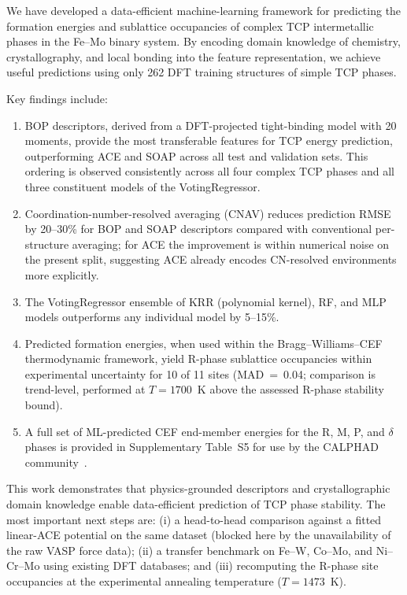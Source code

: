 
We have developed a data-efficient machine-learning framework for predicting the formation energies and sublattice occupancies of complex TCP intermetallic phases in the Fe--Mo binary system. By encoding domain knowledge of chemistry, crystallography, and local bonding into the feature representation, we achieve useful predictions using only 262 DFT training structures of simple TCP phases.

Key findings include:

\begin{enumerate}
  \item BOP descriptors, derived from a DFT-projected tight-binding model with 20 moments, provide the most transferable features for TCP energy prediction, outperforming ACE and SOAP across all test and validation sets. This ordering is observed consistently across all four complex TCP phases and all three constituent models of the VotingRegressor.
  \item Coordination-number-resolved averaging (CNAV) reduces prediction RMSE by 20--30\% for BOP and SOAP descriptors compared with conventional per-structure averaging; for ACE the improvement is within numerical noise on the present split, suggesting ACE already encodes CN-resolved environments more explicitly.
  \item The VotingRegressor ensemble of KRR (polynomial kernel), RF, and MLP models outperforms any individual model by 5--15\%.
  \item Predicted formation energies, when used within the Bragg--Williams--CEF thermodynamic framework, yield R-phase sublattice occupancies within experimental uncertainty for 10 of 11 sites (MAD~=~0.04; comparison is trend-level, performed at $T = 1700$~K above the assessed R-phase stability bound).
  \item A full set of ML-predicted CEF end-member energies for the R, M, P, and $\delta$ phases is provided in Supplementary Table~S5 for use by the CALPHAD community~\cite{lukas_calphad,joubert_dupin_2004}.
\end{enumerate}

This work demonstrates that physics-grounded descriptors and crystallographic domain knowledge enable data-efficient prediction of TCP phase stability. The most important next steps are: (i) a head-to-head comparison against a fitted linear-ACE potential on the same dataset (blocked here by the unavailability of the raw VASP force data); (ii) a transfer benchmark on Fe--W, Co--Mo, and Ni--Cr--Mo using existing DFT databases; and (iii) recomputing the R-phase site occupancies at the experimental annealing temperature ($T = 1473$~K).
